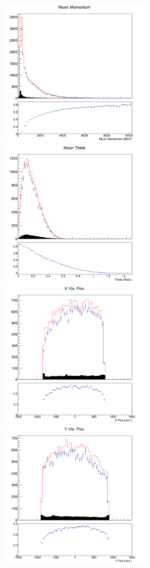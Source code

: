 \begin{figure}[h]
\centering
\includegraphics[width=3in]{Figures/TN100Plots/c_Pwater_4.png}
\includegraphics[width=3in]{Figures/TN100Plots/c_Thwater_4.png}
\includegraphics[width=3in]{Figures/TN100Plots/c_Xwater_4.png}
\includegraphics[width=3in]{Figures/TN100Plots/c_Ywater_4.png}

\end{figure}
